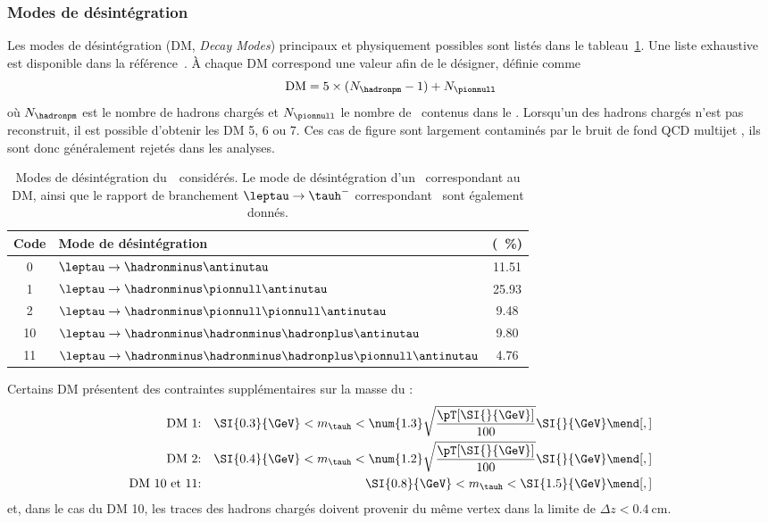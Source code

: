 \subsubsection{Modes de désintégration}
Les modes de désintégration (DM, \emph{Decay Modes}) principaux et physiquement possibles sont listés dans le tableau~\ref{tab-tauh-DMs}.
Une liste exhaustive est disponible dans la référence~\cite{PDG_booklet_2020}.
À chaque DM correspond une valeur afin de le désigner, définie comme
\begin{equation}
\text{DM} = 5\times(N_{\hadronpm}-1) + N_{\pionnull}
\end{equation}
où $N_{\hadronpm}$ est le nombre de hadrons chargés et $N_{\pionnull}$ le nombre de \pionnull\ contenus dans le \tauh.
Lorsqu'un des hadrons chargés n'est pas reconstruit, il est possible d'obtenir les DM 5, 6 ou 7.
Ces cas de figure sont largement contaminés par le bruit de fond \og QCD multijet \fg, ils sont donc généralement rejetés dans les analyses.
\begin{table}[h]
\centering
\begin{tabular}{clc}
\toprule
Code & Mode de désintégration & \BR{} (\SI{}{\%})\\
\midrule
0 & $\leptau\to \hadronminus \antinutau$ & \num{11.51} \\
1 & $\leptau\to \hadronminus \pionnull \antinutau$ & \num{25.93} \\
2 & $\leptau\to \hadronminus \pionnull\pionnull \antinutau$ & \num{9.48} \\
10 & $\leptau\to \hadronminus \hadronminus\hadronplus \antinutau$ & \num{9.80} \\
11 & $\leptau\to \hadronminus \hadronminus\hadronplus\pionnull\antinutau$ & \num{4.76} \\
\bottomrule
\end{tabular}
\caption[Modes de désintégration du~\tau\ considérés.]{Modes de désintégration du~\tau\ considérés. Le mode de désintégration d'un \leptau\ correspondant au DM, ainsi que le rapport de branchement $\leptau\to\tauh^-$ correspondant~\cite{PDG_booklet_2020} sont également donnés.}
\label{tab-tauh-DMs}
\end{table}
\par
Certains DM présentent des contraintes supplémentaires sur la masse du \tauh:
\begin{align*}
\text{DM 1:} && \SI{0.3}{\GeV} < m_{\tauh} < \num{1.3}\sqrt{\frac{\pT[\SI{}{\GeV}]}{100}} \SI{}{\GeV}\mend[,]\\
\text{DM 2:} && \SI{0.4}{\GeV} < m_{\tauh} < \num{1.2}\sqrt{\frac{\pT[\SI{}{\GeV}]}{100}} \SI{}{\GeV}\mend[,]\\
\text{DM 10 et 11:} && \SI{0.8}{\GeV} < m_{\tauh} < \SI{1.5}{\GeV}\mend[,]\\
\end{align*}
et, dans le cas du DM 10, les traces des hadrons chargés doivent provenir du même vertex dans la limite de $\Delta z < \SI{0.4}{\centi\meter}$.
